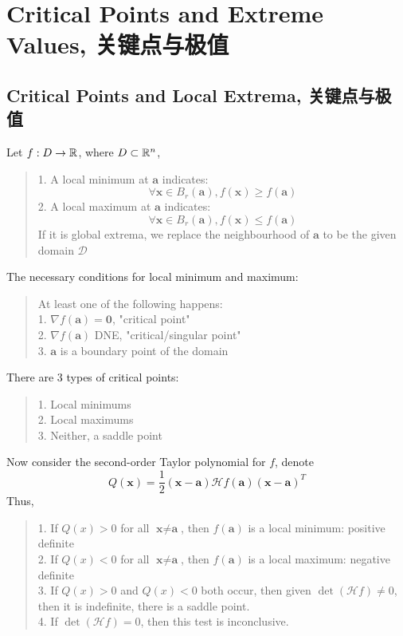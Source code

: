 \section{Critical Points and Extreme Values, 关键点与极值}
\subsection{Critical Points and Local Extrema, 关键点与极值}
Let $f : D \to \mathbb{R}$, where $D \subset \mathbb{R}^n$,
\begin{quote}
    1. A local minimum at $\textbf{a}$ indicates:
    $$\forall \textbf{x} \in B_r(\textbf{a}), f(\textbf{x}) \ge f(\textbf{a})$$
    2. A local maximum at $\textbf{a}$ indicates:
    $$\forall \textbf{x} \in B_r(\textbf{a}), f(\textbf{x}) \le f(\textbf{a})$$
    If it is global extrema, we replace the neighbourhood of $\textbf{a}$ to be the given domain $\mathscr{D}$
\end{quote}
The necessary conditions for local minimum and maximum:
\begin{quote}
    At least one of the following happens: \\
    1. $\nabla f(\textbf{a}) = \textbf{0}$, "critical point"\\
    2. $\nabla f(\textbf{a})$ DNE, "critical/singular point" \\
    3. $\textbf{a}$ is a boundary point of the domain
\end{quote}
There are $3$ types of critical points:
\begin{quote}
    1. Local minimums \\
    2. Local maximums \\
    3. Neither, a saddle point
\end{quote}
Now consider the second-order Taylor polynomial for $f$, denote 
$$Q(\textbf{x}) = \frac{1}{2}(\textbf{x} - \textbf{a}) \mathscr{H}f(\textbf{a}) (\textbf{x} - \textbf{a})^T$$
Thus, 
\begin{quote}
    1. If $Q(x) > 0$ for all $\textbf{x} \ne \textbf{a}$, then $f(\textbf{a})$ is a local minimum: positive definite \\
    2. If $Q(x) < 0$ for all $\textbf{x} \ne \textbf{a}$, then $f(\textbf{a})$ is a local maximum: negative definite \\
    3. If $Q(x) > 0$ and $Q(x) < 0$ both occur, then given $\det(\mathscr{H}f) \ne 0$, then it is indefinite, there is a saddle point. \\
    4. If $\det(\mathscr{H}f) = 0$, then this test is inconclusive.
\end{quote}

